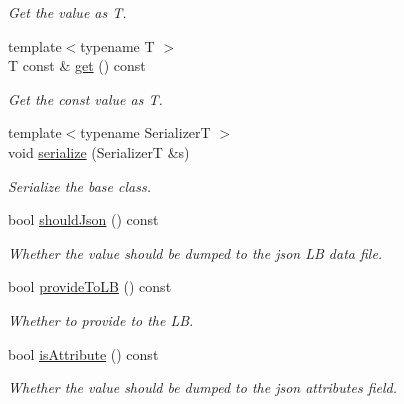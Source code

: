 \begin{DoxyCompactItemize}
\begin{DoxyCompactList}\small\item\em Get the value as {\ttfamily T}. \end{DoxyCompactList}\item 
{\footnotesize template$<$typename T $>$ }\\T const  \& \hyperlink{structvt_1_1vrt_1_1collection_1_1storage_1_1_store_elm_base_aee7baa6c42334cd792c76888cd07cc18}{get} () const
\begin{DoxyCompactList}\small\item\em Get the const value as {\ttfamily T}. \end{DoxyCompactList}\item 
{\footnotesize template$<$typename SerializerT $>$ }\\void \hyperlink{structvt_1_1vrt_1_1collection_1_1storage_1_1_store_elm_base_a6552c32f1795ca501635036adc4e21d7}{serialize} (SerializerT \&s)
\begin{DoxyCompactList}\small\item\em Serialize the base class. \end{DoxyCompactList}\item 
bool \hyperlink{structvt_1_1vrt_1_1collection_1_1storage_1_1_store_elm_base_add1ac8f8fa0142bebb916bfd0474cc16}{should\+Json} () const
\begin{DoxyCompactList}\small\item\em Whether the value should be dumped to the json LB data file. \end{DoxyCompactList}\item 
bool \hyperlink{structvt_1_1vrt_1_1collection_1_1storage_1_1_store_elm_base_ae28a8d2455a7429f43937fbe03249a4a}{provide\+To\+LB} () const
\begin{DoxyCompactList}\small\item\em Whether to provide to the LB. \end{DoxyCompactList}\item 
bool \hyperlink{structvt_1_1vrt_1_1collection_1_1storage_1_1_store_elm_base_a0ba036b143b32129e29749300133a943}{is\+Attribute} () const
\begin{DoxyCompactList}\small\item\em Whether the value should be dumped to the json attributes field. \end{DoxyCompactList}\end{DoxyCompactItemize}
